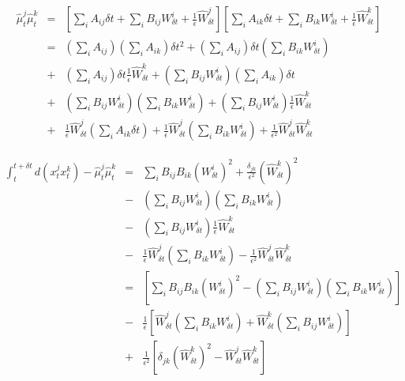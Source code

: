 \documentclass[12pt]{article}
\begin{document}
\begin{eqnarray}
\hat{\mu}_t^j \hat{\mu}_t^k &=& \left[ \sum_i A_{ij} \delta t + \sum_i B_{ij} W_{\delta t}^i + \frac{1}{\epsilon} \hat{W}_{\delta t}^j \right] \left[ \sum_i A_{ik} \delta t + \sum_i B_{ik} W_{\delta t}^i + \frac{1}{\epsilon} \hat{W}_{\delta t}^k \right] \\
&=& \left( \sum_i A_{ij} \right) \left( \sum_i A_{ik} \right) \delta t^2
+ \left( \sum_i A_{ij} \right) \delta t \left( \sum_i B_{ik} W_{\delta t}^i \right) \\
&+& \left( \sum_i A_{ij} \right) \delta t \frac{1}{\epsilon} \hat{W}_{\delta t}^k
+ \left( \sum_i B_{ij} W_{\delta t}^i \right) \left( \sum_i A_{ik} \right) \delta t \\
&+& \left( \sum_i B_{ij} W_{\delta t}^i \right) \left( \sum_i B_{ik} W_{\delta t}^i \right)
+ \left( \sum_i B_{ij} W_{\delta t}^i \right) \frac{1}{\epsilon} \hat{W}_{\delta t}^k \\
&+& \frac{1}{\epsilon} \hat{W}_{\delta t}^j \left( \sum_i A_{ik} \delta t \right) 
+ \frac{1}{\epsilon} \hat{W}_{\delta t}^j \left( \sum_i B_{ik} W_{\delta t}^i \right) 
+ \frac{1}{\epsilon^2} \hat{W}_{\delta t}^j \hat{W}_{\delta t}^k
\end{eqnarray}

\begin{eqnarray}
\int_t^{t + \delta t} d(x_t^j x_t^k)  - \hat{\mu}_t^j \hat{\mu}_t^k 
&=& \sum_i B_{ij} B_{ik} \left(W_{\delta t}^i\right)^2  
+ \frac{\delta_{jk}}{\epsilon^2} (\hat{W}_{\delta t}^k)^2 \\
&-& \left( \sum_i B_{ij} W_{\delta t}^i \right) \left( \sum_i B_{ik} W_{\delta t}^i \right) \\
&-& \left( \sum_i B_{ij} W_{\delta t}^i \right) \frac{1}{\epsilon} \hat{W}_{\delta t}^k \\
&-& \frac{1}{\epsilon} \hat{W}_{\delta t}^j \left( \sum_i B_{ik} W_{\delta t}^i \right) 
- \frac{1}{\epsilon^2} \hat{W}_{\delta t}^j \hat{W}_{\delta t}^k \\
&=& \left[\sum_i B_{ij} B_{ik} \left(W_{\delta t}^i\right)^2 - \left( \sum_i B_{ij} W_{\delta t}^i \right) \left( \sum_i B_{ik} W_{\delta t}^i \right) \right] \\
&-& \frac{1}{\epsilon} \left[\hat{W}_{\delta t}^j \left( \sum_i B_{ik} W_{\delta t}^i \right) + \hat{W}_{\delta t}^k \left( \sum_i B_{ij} W_{\delta t}^i \right) \right] \\
&+& \frac{1}{\epsilon^2} \left[ \delta_{jk} (\hat{W}_{\delta t}^k)^2 - \hat{W}_{\delta t}^j \hat{W}_{\delta t}^k \right]
\end{eqnarray}
\end{document}
